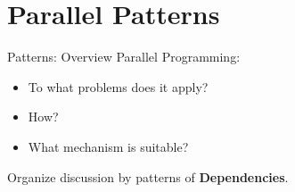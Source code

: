 \documentclass[english,compress]{beamer}
\begin{document}
\section{Parallel Patterns}
\begin{frame}{Patterns: Overview}
  Parallel Programming:
  \begin{itemize}
    \item To what problems does it apply?
    \item How?
    \item What mechanism is suitable?
  \end{itemize}

  \bigskip
  Organize discussion by patterns of \textbf{Dependencies}.
  \uncover<+->{}
\end{frame}
\end{document}
